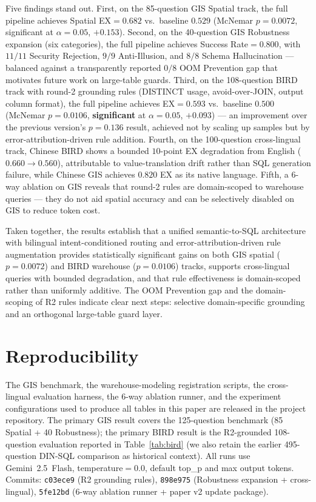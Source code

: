 \documentclass[11pt]{article}
\begin{document}
Five findings stand out. First, on the 85-question GIS Spatial track, the full pipeline achieves Spatial EX$=0.682$ vs.\ baseline $0.529$ (McNemar $p=0.0072$, significant at $\alpha=0.05$, $+0.153$). Second, on the 40-question GIS Robustness expansion (six categories), the full pipeline achieves Success Rate$=0.800$, with $11/11$ Security Rejection, $9/9$ Anti-Illusion, and $8/8$ Schema Hallucination --- balanced against a transparently reported $0/8$ OOM Prevention gap that motivates future work on large-table guards. Third, on the 108-question BIRD track with round-2 grounding rules (DISTINCT usage, avoid-over-JOIN, output column format), the full pipeline achieves EX$=0.593$ vs.\ baseline $0.500$ (McNemar $p=0.0106$, \textbf{significant} at $\alpha=0.05$, $+0.093$) --- an improvement over the previous version's $p=0.136$ result, achieved not by scaling up samples but by error-attribution-driven rule addition. Fourth, on the 100-question cross-lingual track, Chinese BIRD shows a bounded $10$-point EX degradation from English ($0.660 \to 0.560$), attributable to value-translation drift rather than SQL generation failure, while Chinese GIS achieves $0.820$ EX as its native language. Fifth, a 6-way ablation on GIS reveals that round-2 rules are domain-scoped to warehouse queries --- they do not aid spatial accuracy and can be selectively disabled on GIS to reduce token cost.

Taken together, the results establish that a unified semantic-to-SQL architecture with bilingual intent-conditioned routing and error-attribution-driven rule augmentation provides statistically significant gains on both GIS spatial ($p=0.0072$) and BIRD warehouse ($p=0.0106$) tracks, supports cross-lingual queries with bounded degradation, and that rule effectiveness is domain-scoped rather than uniformly additive. The OOM Prevention gap and the domain-scoping of R2 rules indicate clear next steps: selective domain-specific grounding and an orthogonal large-table guard layer.

\section*{Reproducibility}
The GIS benchmark, the warehouse-modeling registration scripts, the cross-lingual evaluation harness, the 6-way ablation runner, and the experiment configurations used to produce all tables in this paper are released in the project repository. The primary GIS result covers the 125-question benchmark (85 Spatial + 40 Robustness); the primary BIRD result is the R2-grounded 108-question evaluation reported in Table~\ref{tab:bird} (we also retain the earlier 495-question DIN-SQL comparison as historical context). All runs use Gemini~2.5~Flash, temperature$=0.0$, default top\_p and max output tokens. Commits: \texttt{c03ece9} (R2 grounding rules), \texttt{898e975} (Robustness expansion + cross-lingual), \texttt{5fe12bd} (6-way ablation runner + paper v2 update package).
\end{document}
